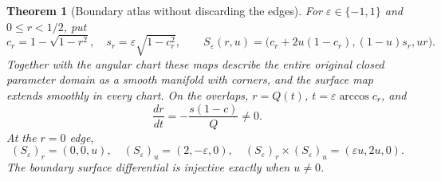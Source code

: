 \documentclass[11pt,a4paper]{article}
\newtheorem{theorem}{Theorem}[section]
\theoremstyle{definition}\newtheorem{definition}[theorem]{Definition}
\theoremstyle{remark}\newtheorem{remark}[theorem]{Remark}
\begin{document}
\begin{theorem}[Boundary atlas without discarding the edges]\label{thm:atlas}
For $\varepsilon\in\{-1,1\}$ and $0\leq r<1/2$, put
\[
 c_r=1-\sqrt{1-r^2},\quad s_r=\varepsilon\sqrt{1-c_r^2},\qquad
 S_\varepsilon(r,u)=\big(c_r+2u(1-c_r),(1-u)s_r,ur\big).
\]
Together with the angular chart these maps describe the entire original
closed parameter domain as a smooth manifold with corners, and the surface
map extends smoothly in every chart. On the overlaps,
$r=Q(t)$, $t=\varepsilon\arccos c_r$, and
\begin{equation}\label{eq:transition}
 \frac{dr}{dt}=-\frac{s(1-c)}{Q}\ne0.
\end{equation}
At the $r=0$ edge,
\begin{equation}\label{eq:boundary-derivative}
 (S_\varepsilon)_r=(0,0,u),\quad
 (S_\varepsilon)_u=(2,-\varepsilon,0),\quad
 (S_\varepsilon)_r\times(S_\varepsilon)_u=(\varepsilon u,2u,0).
\end{equation}
The boundary surface differential is injective exactly when $u\ne0$.
\end{theorem}
\end{document}
